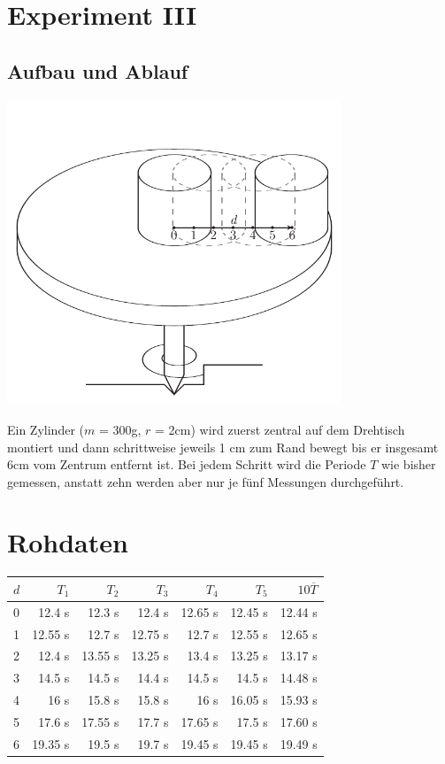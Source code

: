 \documentclass[12pt,a4paper]{article}
\begin{document}
\newpage
\section*{Experiment III}
\subsection*{Aufbau und Ablauf}

\begin{center}
\includegraphics[width=10cm]{illustration3.pdf}
\end{center}
Ein Zylinder ($m$ = 300g, $r$ = 2cm) wird zuerst zentral auf dem Drehtisch montiert und dann schrittweise jeweils 1 cm zum Rand bewegt bis er insgesamt 6cm vom Zentrum entfernt ist. Bei jedem Schritt wird die Periode $T$ wie bisher gemessen, anstatt zehn werden aber nur je f\"unf Messungen durchgef\"uhrt.

\section*{Rohdaten}

\begin{tabular}{|l|r|r|r|r|r|r|}
\hline
$d$&$T_1$&$T_2$&$T_3$&$T_4$&$T_5$&$10\overline{T}$\\
\hline
0&12.4 s&12.3 s&12.4 s&12.65 s&12.45 s&12.44 s\\
1&12.55 s&12.7 s&12.75 s&12.7 s&12.55 s&12.65 s\\
2&12.4 s&13.55 s&13.25 s&13.4 s&13.25 s&13.17 s\\
3&14.5 s&14.5 s&14.4 s&14.5 s&14.5 s&14.48 s\\
4&16 s&15.8 s&15.8 s&16 s&16.05 s&15.93 s\\
5&17.6 s&17.55 s&17.7 s&17.65 s&17.5 s&17.60 s\\
6&19.35 s&19.5 s&19.7 s&19.45 s&19.45 s&19.49 s\\
\hline
\end{tabular}
\end{document}
